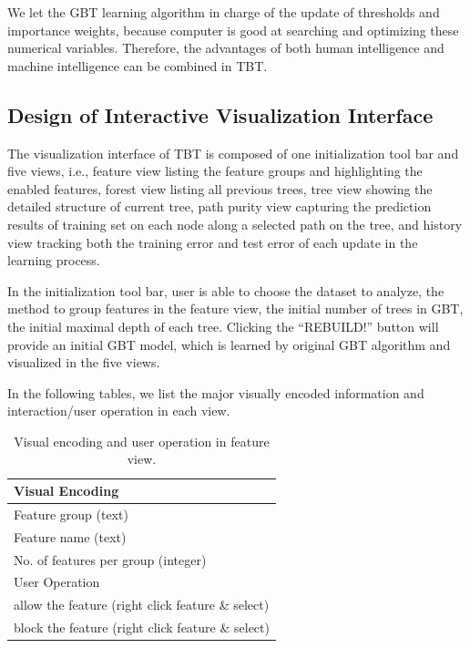 \documentclass{chi2009}
\begin{document}
We let the GBT learning algorithm in charge of the update of thresholds and importance weights, because computer is good at searching and optimizing these numerical variables. Therefore, the advantages of both human intelligence and machine intelligence can be combined in TBT.

\subsection{Design of Interactive Visualization Interface}

The visualization interface of TBT is composed of one initialization tool bar and five views, i.e., feature view listing the feature groups and highlighting the enabled features, forest view listing all previous trees, tree view showing the detailed structure of current tree, path purity view capturing the prediction results of training set on each node along a selected path on the tree, and history view tracking both the training error and test error of each update in the learning process. 

In the initialization tool bar, user is able to choose the dataset to analyze, the method to group features in the feature view, the initial number of trees in GBT, the initial maximal depth of each tree. Clicking the ``REBUILD!'' button will provide an initial GBT model, which is learned by original GBT algorithm and visualized in the five views.

In the following tables, we list the major visually encoded information and interaction/user operation in each view.

\begin{table}[ht]
\caption{Visual encoding and user operation in feature view.}
\begin{center}
\begin{tabular}{|l|}
\hline
Visual Encoding\\
\hline
Feature group (text)\\
Feature name (text)\\
No. of features per group (integer) \\
\hline
\hline 
User Operation\\
\hline
allow the feature (right click feature \& select)\\
block the feature (right click feature \& select)\\
\hline
\end{tabular}
\end{center}
\end{table}
\end{document}
